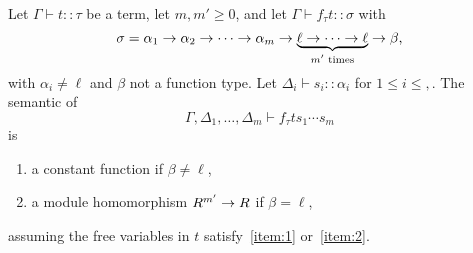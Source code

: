 \begin{lemma}
  \label{th:lininference}
  Let $\Gamma\vdash t::\tau$ be a term, let $m,m'\ge0$, and let
  $\Gamma\vdash f_{\tau}t::\sigma$ with
  \begin{equation}
    \label{eq:264}
    \sigma=\alpha_1\rightarrow\alpha_2\rightarrow\cdots\rightarrow\alpha_m\rightarrow\underbrace{\ell\rightarrow\cdots\rightarrow\ell}_{\text{$m'$ times}}\rightarrow\beta
    \text{,}    
  \end{equation}
  with $\alpha_i\ne\ell$ and $\beta$ not a function type. Let
  $\Delta_i\vdash s_i::\alpha_i$ for $1\le i\le ,$. The semantic of
  \begin{equation}
    \label{eq:270}
    \Gamma,\Delta_1,\ldots,\Delta_m\vdash f_\tau ts_1\cdots s_m
  \end{equation}
  is
  \begin{enumerate}
  \item\label{item:1} a constant function if $\beta\ne\ell$,
  \item\label{item:2} a module homomorphism $R^{m'}\rightarrow R$ if $\beta=\ell$,
  \end{enumerate}
  assuming the free variables in $t$ satisfy~\ref{item:1}
  or~\ref{item:2}.
\end{lemma}
